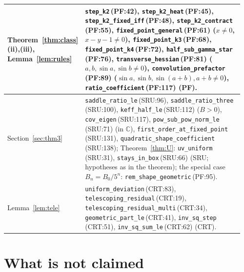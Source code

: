 \documentclass[11pt,a4paper]{article}
\theoremstyle{definition}
\theoremstyle{remark}
\newcommand{\code}[1]{\texttt{#1}}
\begin{document}
{\begin{longtable}{@{}p{0.2\linewidth}p{0.76\linewidth}@{}}
\midrule
Theorem~\ref{thm:class}(ii),(iii), Lemma~\ref{lem:rules} & \code{step\_k2}\,{\scriptsize(PF:42)}, \code{step\_k2\_heat}\,{\scriptsize(PF:45)}, \code{step\_k2\_fixed\_iff}\,{\scriptsize(PF:48)}, \code{step\_k2\_contract}\,{\scriptsize(PF:55)}, \code{fixed\_point\_general}\,{\scriptsize(PF:61)} ($x\ne0$, $x-y-1\ne0$), \code{fixed\_point\_k3}\,{\scriptsize(PF:68)}, \code{fixed\_point\_k4}\,{\scriptsize(PF:72)}, \code{half\_sub\_gamma\_star}\,{\scriptsize(PF:76)}, \code{transverse\_hessian}\,{\scriptsize(PF:81)} ($a,b,\sin a,\sin b\ne0$), \code{convolution\_prefactor}\,{\scriptsize(PF:89)} ($\sin a,\sin b,\sin(a+b),a+b\ne0$), \code{ratio\_coefficient}\,{\scriptsize(PF:117)} (PF). \\
\midrule
Section~\ref{sec:thm3} & \code{saddle\_ratio\_le}\,{\scriptsize(SRU:96)}, \code{saddle\_ratio\_three}\,{\scriptsize(SRU:100)}, \code{keff\_half\_le}\,{\scriptsize(SRU:112)} ($B>0$), \code{cov\_eigen}\,{\scriptsize(SRU:117)}, \code{pow\_sub\_\allowbreak{}pow\_norm\_le}\,{\scriptsize(SRU:71)} (in $\mathbb{C}$), \code{first\_order\_\allowbreak{}at\_fixed\_point}\,{\scriptsize(SRU:131)}, \code{quadratic\_shape\_\allowbreak{}coefficient}\,{\scriptsize(SRU:138)}; Theorem~\ref{thm:U}: \code{uv\_uniform}\,{\scriptsize(SRU:31)}, \code{stays\_in\_box}\,{\scriptsize(SRU:66)} (SRU; hypotheses as in the theorem); the special case $B_n=B_0/5^n$: \code{rem\_shape\_geometric}\,{\scriptsize(PF:95)}. \\
\midrule
Lemma~\ref{lem:tele} & \code{uniform\_deviation}\,{\scriptsize(CRT:83)}, \code{telescoping\_residual}\,{\scriptsize(CRT:19)}, \code{telescoping\_residual\_multi}\,{\scriptsize(CRT:34)}, \code{geometric\_part\_le}\,{\scriptsize(CRT:41)}, \code{inv\_sq\_step}\,{\scriptsize(CRT:51)}, \code{inv\_sq\_sum\_le}\,{\scriptsize(CRT:62)} (CRT). \\
\bottomrule
\end{longtable}}

\section{What is not claimed}\label{sec:notclaimed}
\end{document}
